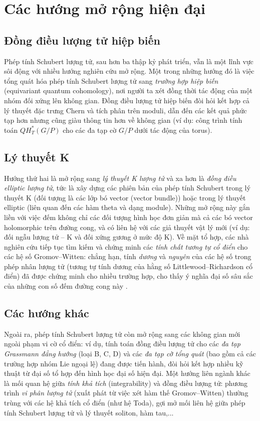 
\section{Các hướng mở rộng hiện đại}
\subsection{Đồng điều lượng tử hiệp biến}
Phép tính Schubert lượng tử, sau hơn ba thập kỷ phát triển, vẫn là một lĩnh vực sôi động với nhiều hướng nghiên cứu mở rộng. Một trong những hướng đó là việc tổng quát hóa phép tính Schubert lượng tử sang \textit{trường hợp hiệp biến} (equivariant quantum cohomology), nơi người ta xét đồng thời tác động của một nhóm đối xứng lên không gian. Đồng điều lượng tử hiệp biến đòi hỏi kết hợp cả lý thuyết đặc trưng Chern và tích phân trên moduli, dẫn đến các kết quả phức tạp hơn nhưng cũng giàu thông tin hơn về không gian (ví dụ: công trình tính toán $QH_T^*(G/P)$ cho các đa tạp cờ $G/P$ dưới tác động của torus). 

\subsection{Lý thuyết K}
Hướng thứ hai là mở rộng sang \textit{lý thuyết K lượng tử} và xa hơn là \textit{đồng điều elliptic lượng tử}, tức là xây dựng các phiên bản của phép tính Schubert trong lý thuyết K (đối tượng là các lớp bó vector (vector bundle)) hoặc trong lý thuyết elliptic (liên quan đến các hàm theta và dạng module). Những mở rộng này gắn liền với việc đếm không chỉ các đối tượng hình học đơn giản mà cả các bó vector holomorphic trên đường cong, và có liên hệ với các giả thuyết vật lý mới (ví dụ: đối ngẫu lượng tử – K và đối xứng gương ở mức độ K). Về mặt tổ hợp, các nhà nghiên cứu tiếp tục tìm kiếm và chứng minh các \textit{tính chất tương tự cổ điển} cho các hệ số Gromov–Witten: chẳng hạn, tính \textit{dương} và \textit{nguyên} của các hệ số trong phép nhân lượng tử (tương tự tính dương của hằng số Littlewood–Richardson cổ điển) đã được chứng minh cho nhiều trường hợp, cho thấy ý nghĩa đại số sâu sắc của những con số đếm đường cong này \cite{XXX}. 

\subsection{Các hướng khác}
Ngoài ra, phép tính Schubert lượng tử còn mở rộng sang các không gian mới ngoài phạm vi cờ cổ điển: ví dụ, tính toán đồng điều lượng tử cho các \textit{đa tạp Grassmann đẳng hướng} (loại B, C, D) và các \textit{đa tạp cờ tổng quát} (bao gồm cả các trường hợp nhóm Lie ngoại lệ) đang được tiến hành, đòi hỏi kết hợp nhiều kỹ thuật từ đại số tổ hợp đến hình học đại số hiện đại. Một hướng liên ngành khác là mối quan hệ giữa \textit{tính khả tích} (integrability) và đồng điều lượng tử: phương trình \textit{vi phân lượng tử} (xuất phát từ việc xét hàm thế Gromov–Witten) thường trùng với các hệ khả tích cổ điển (như hệ Toda), gợi mở mối liên hệ giữa phép tính Schubert lượng tử và lý thuyết soliton, hàm tau,...

